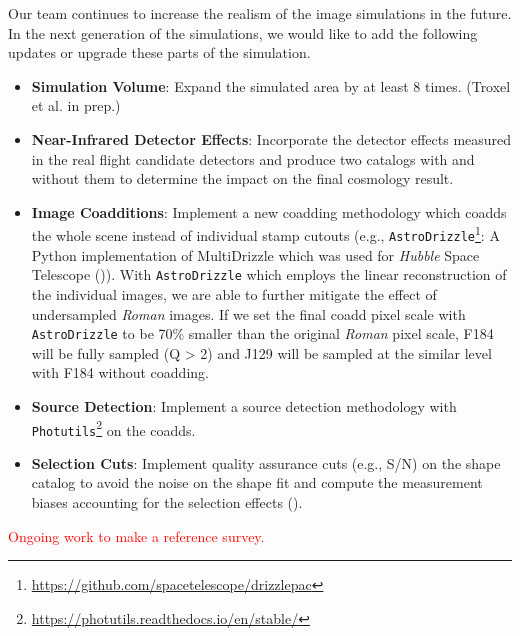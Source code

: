 \documentclass[fleqn,usenatbib]{mnras}
\begin{document}
Our team continues to increase the realism of the image simulations in the future. In the next generation of the simulations, we would like to add the following updates or upgrade these parts of the simulation. 
\begin{itemize}
    \setlength\itemsep{1em}
    \item \textbf{Simulation Volume}: Expand the simulated area by at least 8 times. (Troxel et al. in prep.)
    
    \item \textbf{Near-Infrared Detector Effects}: Incorporate the detector effects measured in the real flight candidate detectors and produce two catalogs with and without them to determine the impact on the final cosmology result.
    
    \item \textbf{Image Coadditions}: Implement a new coadding methodology which coadds the whole scene instead of individual stamp cutouts (e.g., \texttt{AstroDrizzle}\footnote{\url{https://github.com/spacetelescope/drizzlepac}}: A Python implementation of MultiDrizzle which was used for \emph{Hubble} Space Telescope (\citealt{2003hstc.conf..325B})). With \texttt{AstroDrizzle} which employs the linear reconstruction of the individual images, we are able to further mitigate the effect of undersampled \emph{Roman} images. If we set the final coadd pixel scale with \texttt{AstroDrizzle} to be 70\% smaller than the original \emph{Roman} pixel scale, F184 will be fully sampled (Q > 2) and J129 will be sampled at the similar level with F184 without coadding. 
    
    \item \textbf{Source Detection}: Implement a source detection methodology with \texttt{Photutils}\footnote{\url{https://photutils.readthedocs.io/en/stable/}} on the coadds.
    
    \item \textbf{Selection Cuts}: Implement quality assurance cuts (e.g., S/N) on the shape catalog to avoid the noise on the shape fit and compute the measurement biases accounting for the selection effects (\citealt{2017ApJ...841...24S}). 
\end{itemize}
\textcolor{red}{Ongoing work to make a reference survey. }
\end{document}

